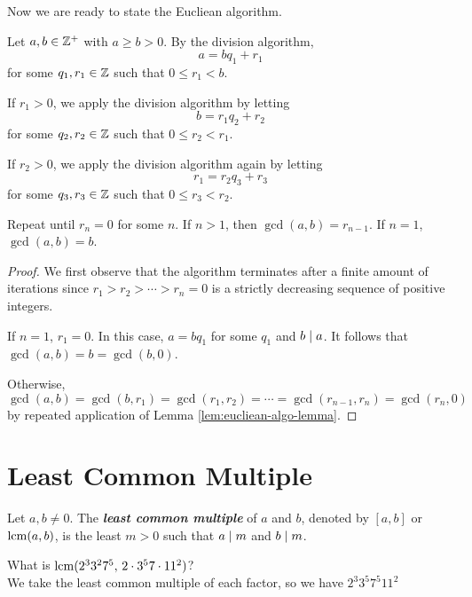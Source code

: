 Now we are ready to state the Eucliean algorithm.

\begin{theorem}
    Let $a,b \in \mathbb{Z}^+$ with $a \geq b > 0$. By the division algorithm, 
    $$
    a = bq_1 + r_1
    $$
    for some $q_1,r_1 \in \mathbb{Z}$ such that $0 \leq r_1 < b$. 
    
    If $r_1 > 0$, we apply the division algorithm by letting
    $$
    b = r_1 q_2 + r_2
    $$
    for some $q_2,r_2 \in \mathbb{Z}$ such that $0 \leq r_2 < r_1$.

    If $r_2 > 0$, we apply the division algorithm again by letting
    $$
    r_1 = r_2q_3 + r_3
    $$
    for some $q_3,r_3 \in \mathbb{Z}$ such that $0 \leq r_3 < r_2$.

    Repeat until $r_n = 0$ for some $n$. If $n > 1$, then $\gcd(a,b) = r_{n-1}$. If $n=1$, $\gcd(a,b) = b$.
\end{theorem}

\begin{proof}
    We first observe that the algorithm terminates after a finite amount of iterations since $r_1 > r_2 > \cdots > r_n = 0$ is a strictly decreasing sequence of positive integers.

    If $n = 1$, $r_1 = 0$. In this case, $a = bq_1$ for some $q_1$ and $b \mathrel{\mid} a$. It follows that $\gcd(a,b) = b = \gcd(b,0)$.

    Otherwise,
    $$
    \gcd(a,b) = \gcd(b,r_1) = \gcd(r_1,r_2) = \cdots = \gcd(r_{n-1}, r_n) = \gcd(r_{n},0)
    $$
    by repeated application of Lemma \ref{lem:eucliean-algo-lemma}.
\end{proof}

\section{Least Common Multiple}

\begin{definition}
    Let $a,b \neq 0$. The \textit{\textbf{least common multiple}} of $a$ and $b$, denoted by $[a,b]$ or $\mathrm{lcm}(a,b)$, is the least $m > 0$ such that $a \mathrel{\mid} m$ and $b \mathrel{\mid} m$.
\end{definition}

\begin{example}
    What is $\mathrm{lcm}(2^3 3^2 7^5,\, 2 \cdot 3^5 7 \cdot 11^2)$? \\
    We take the least common multiple of each factor, so we have $2^3 3^5 7^5 11^2$ 
\end{example}

